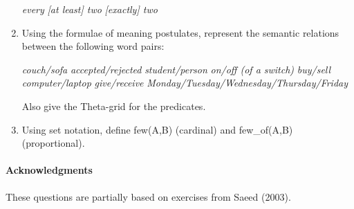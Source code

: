 \documentclass[a4paper]{article}
\begin{document}
\begin{enumerate}
\begin{exe}
    \ex \textit{every }
    \ex \textit{{[at least]} two}
    \ex \textit{{[exactly]} two}
  \end{exe}
\item Using the formulae of meaning postulates, represent the
  semantic relations between the following word pairs:
  \begin{exe}
    \ex \textit{couch/sofa}
    \ex \textit{accepted/rejected}
    \ex \textit{student/person}
    \ex \textit{on/off (of a switch)}
    \ex \textit{buy/sell}
    \ex \textit{computer/laptop}
    \ex \textit{give/receive}
    \ex \textit{Monday/Tuesday/Wednesday/Thursday/Friday}
  \end{exe}
  Also give the Theta-grid for the predicates.
\item Using set notation, define \textup{few(A,B)} (cardinal) and
  \textup{few\_of(A,B)} (proportional).



  
\end{enumerate}
\vfill
\paragraph{Acknowledgments} These questions are partially
based on exercises from Saeed (2003).
\end{document}
